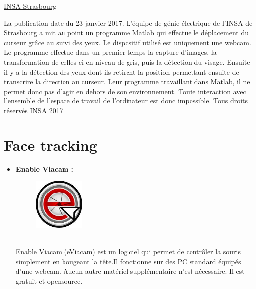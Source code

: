 \documentclass[a4paper, 12pt]{report}
\begin{document}
\underline{INSA-Strasbourg\cite{c5}}\\
\par La publication date du 23 janvier 2017.
L'équipe de génie électrique de l'INSA de Strasbourg a mit au point un programme Matlab qui effectue le déplacement du curseur grâce au suivi des yeux. Le dispositif utilisé est uniquement une webcam. Le programme effectue dans un premier temps la capture d'images, la transformation de celles-ci en niveau de gris, puis la détection du visage. Ensuite il y a la détection des yeux dont ils retirent la position permettant ensuite de transcrire la direction au curseur. Leur programme travaillant dans Matlab, il ne permet donc pas d'agir en dehors de son environnement. Toute interaction avec l'ensemble de l'espace de travail de l'ordinateur est donc impossible. Tous droits réservés INSA 2017.

\newpage
\section{Face tracking}
\begin{itemize}
\item \textbf{Enable Viacam\cite{c14} :}
\begin{figure}[!ht]
\centering
\includegraphics[height=2.5cm]{index.jpeg}
\end{figure}
\\Enable Viacam (eViacam) est un logiciel qui permet de contrôler la souris simplement en bougeant la tête.Il fonctionne sur des PC standard équipés d'une webcam. Aucun autre matériel supplémentaire n'est nécessaire. Il est gratuit et opensource.
\end{itemize}
\end{document}
